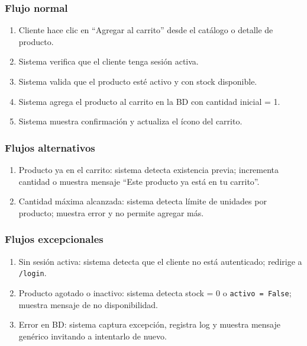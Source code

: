 \documentclass[12pt,a4paper]{article}
\begin{document}
\subsubsection*{Flujo normal}
\begin{enumerate}[label=FN-\arabic*]
    \item Cliente hace clic en “Agregar al carrito” desde el catálogo o detalle de producto.
    \item Sistema verifica que el cliente tenga sesión activa.
    \item Sistema valida que el producto esté activo y con stock disponible.
    \item Sistema agrega el producto al carrito en la BD con cantidad inicial = 1.
    \item Sistema muestra confirmación y actualiza el ícono del carrito.
\end{enumerate}

\subsubsection*{Flujos alternativos}
\begin{enumerate}[label=FA-\arabic*]
    \item Producto ya en el carrito: sistema detecta existencia previa; incrementa cantidad o muestra mensaje “Este producto ya está en tu carrito”.
    \item Cantidad máxima alcanzada: sistema detecta límite de unidades por producto; muestra error y no permite agregar más.
\end{enumerate}

\subsubsection*{Flujos excepcionales}
\begin{enumerate}[label=FE-\arabic*]
    \item Sin sesión activa: sistema detecta que el cliente no está autenticado; redirige a \texttt{/login}.
    \item Producto agotado o inactivo: sistema detecta stock = 0 o \texttt{activo = False}; muestra mensaje de no disponibilidad.
    \item Error en BD: sistema captura excepción, registra log y muestra mensaje genérico invitando a intentarlo de nuevo.
\end{enumerate}

\end{document}
